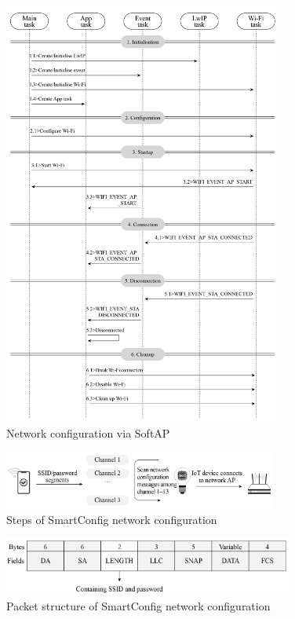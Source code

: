 \documentclass[a4paper,12pt,openany]{book}
\begin{document}
\begin{figure}[!h]
    \centering
    \includegraphics[width=0.82\textwidth]{D7Z/7-22}
    \caption{Network configuration via SoftAP}
\end{figure}

\begin{figure}[!h]
    \centering
    \includegraphics[width=0.8\textwidth]{D7Z/7-23}
    \caption{Steps of SmartConfig network configuration}
\end{figure}

\vspace{6pt}
\begin{figure}[!h]
    \centering
    \includegraphics[width=0.85\textwidth]{D7Z/7-24}
    \caption{Packet structure of SmartConfig network configuration}
\end{figure}
\end{document}
